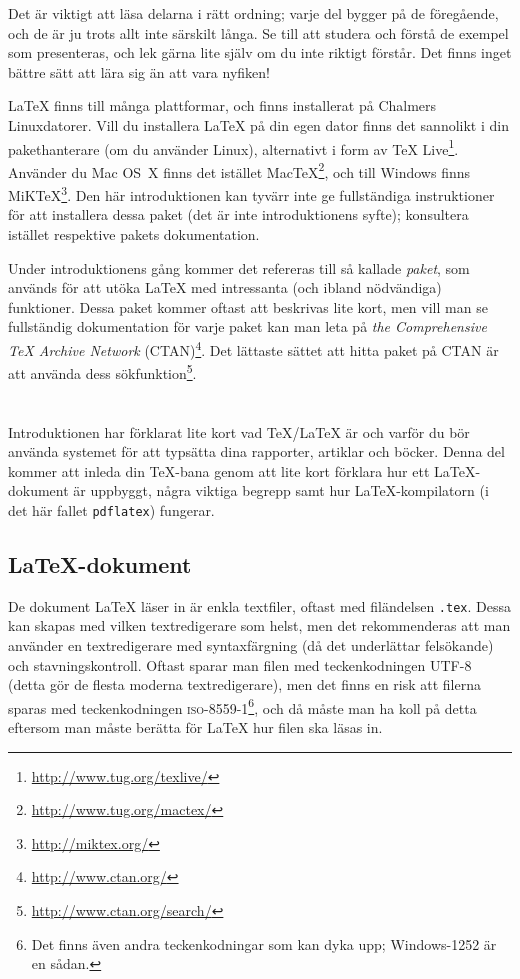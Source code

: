 \documentclass[swe,10pt,nofont]{skrapport}
\makeatletter
\newcounter{kod}\renewcommand\thekod{\@arabic\c@kod}
\let\section@old=\section
\renewcommand\section{\@ifstar\my@section@star\my@section}
\newcommand\my@section[2][\@empty]{\cleardoublepage\vspace*{2\bigskipamount}\ifx\@empty#1\section@old{#2}\else\section@old[#1]{#2}\fi}
\newcommand\my@section@star[2][\@empty]{\cleardoublepage\vspace*{2\bigskipamount}\ifx\@empty#1\section@old*{#2}\else\section@old*[#1]{#2}\fi}
\let\@oldLaTeX\LaTeX
\def\LaTeX{\texorpdfstring{\@oldLaTeX}{LaTeX}}
\newcommand\UTF{\textsc{UTF-8}\xspace}					%
\newcommand\cli[1]{\texttt{#1}}							%
\makeatother
\begin{document}
	\newpage %
	Det är viktigt att läsa delarna i rätt ordning; varje del bygger på de
	föregående, och de är ju trots allt inte särskilt långa. Se till att
	studera och förstå de exempel som presenteras, och lek gärna lite själv
	om du inte riktigt förstår. Det finns inget bättre sätt att lära sig än
	att vara nyfiken!
	
	\LaTeX{} finns till många plattformar, och finns installerat på Chalmers
	Linux\-da\-to\-rer. Vill du installera \LaTeX{} på din egen dator finns det
	sannolikt i din pakethanterare (om du använder Linux), alternativt i form
	av \TeX{} Live\footnote{\url{http://www.tug.org/texlive/}}. Använder du
	Mac OS~X finns det istället
	Mac\TeX\footnote{\url{http://www.tug.org/mactex/}}, och till Windows finns
	MiK\TeX\footnote{\url{http://miktex.org/}}. Den här introduktionen kan
	tyvärr inte ge fullständiga instruktioner för att installera dessa paket
	(det är inte introduktionens syfte);
	konsultera istället respektive pakets dokumentation.
	
	Under introduktionens gång kommer det refereras till så kallade
	\emph{paket}, som används för att utöka \LaTeX{} med intressanta (och
	ibland nödvändiga) funktioner. Dessa paket kommer oftast att beskrivas
	lite kort, men vill man se fullständig dokumentation för varje paket
	kan man leta på \emph{the Comprehensive \TeX{} Archive Network}
	(CTAN)\footnote{\url{http://www.ctan.org/}\label{sec:ctan}}.
	Det lättaste sättet att hitta paket på CTAN är att använda dess
	sökfunktion\footnote{\url{http://www.ctan.org/search/}}.
	 
	\section{Grundläggande begrepp}\label{sec:1}
	Introduktionen har förklarat lite kort vad \TeX/\LaTeX{} är och varför du
	bör använda systemet för att typsätta dina rapporter, artiklar och böcker.
	Denna del kommer att inleda din \TeX-bana genom att lite kort förklara hur
	ett \LaTeX-dokument är uppbyggt, några viktiga begrepp samt hur
	\LaTeX-kompilatorn (i det här fallet \cli{pdflatex}) fungerar.
	
	\subsection{\LaTeX-dokument}
	De dokument \LaTeX{} läser in är enkla textfiler, oftast med filändelsen
	\cli{.tex}. Dessa kan skapas med vilken textredigerare som helst,
	men det rekommenderas att man använder
	en textredigerare med syntaxfärgning (då det underlättar felsökande) och
	stavningskontroll. Oftast sparar man filen med teckenkodningen \UTF{} 
	(detta gör de flesta moderna textredigerare), men det finns en risk att
	filerna sparas med teckenkodningen \textsc{iso-8559-1}\footnote{Det finns 
	även andra teckenkodningar som kan dyka upp; Windows-1252 är en sådan.}, 
	och då måste man ha koll på detta eftersom man måste berätta för \LaTeX{}
	hur filen ska läsas in.
	
\end{document}
